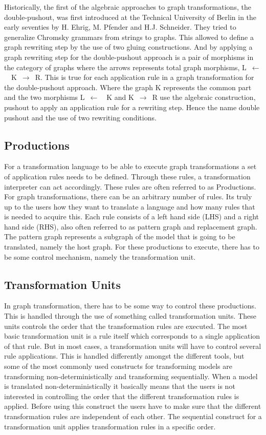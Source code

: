\documentclass[pdftex,11pt,a4paper]{article}
\begin{document}
\indent Historically, the first of the algebraic approaches to graph
transformations, the double-pushout, was first introduced at the Technical
University of Berlin in the early seventies by H. Ehrig, M. Pfender and H.J.
Schneider\cite{INSPEC:606170}. They tried to generalize Chromsky grammars from
strings to graphs. This allowed to define a graph rewriting step by the use of
two gluing constructions. And by applying a graph rewriting step for the
double-pushout approach is a pair of morphisms in the category of graphs where
the arrows represents total graph morphisms, \linebreak\mbox{L $\longleftarrow$
\ K $\longrightarrow$ R}. This is true for each application rule in a graph
transformation for the double-pushout approach. Where the graph K represents the
common part and the two morphisms \mbox{L $\longleftarrow$ \ K} and \mbox{K
$\longrightarrow$ R} use the algebraic construction, pushout to apply an
application rule for a rewriting step. Hence the name double pushout and the use
of two rewriting conditions.

\subsection{Productions}
\noindent For a transformation language to be able to execute graph
transformations a set of application rules needs to be defined. Through these
rules, a transformation interpreter can act accordingly. These rules are often
referred to as Productions. For graph transformations, there can be an arbitrary
number of rules. Its truly up to the users how they want to translate a
language and how many rules that is needed to acquire this. Each rule consists
of a left hand side (LHS) and a right hand side (RHS), also often referred to as
pattern graph and replacement graph. The pattern graph represents a subgraph of
the model that is going to be translated, namely the host graph. For these
productions to execute, there has to be some control mechanism, namely the
transformation unit.


\subsection{Transformation Units}
\noindent In graph transformation, there has to be some way to control these
productions. This is handled through the use of something called transformation
units. These units controls the order that the transformation rules are
executed. The most basic transformation unit is a rule itself which corresponds
to a single application of that rule. But in most cases, a transformation units
will have to control several rule applications. This is handled differently
amongst the different tools, but some of the most commonly used constructs for
transforming models are transforming non-deterministically and transforming
sequentially. When a model is translated non-deterministically it basically
means that the users is not interested in controlling the order that the
different transformation rules is applied. Before using this construct the users
have to make sure that the different transformation rules are independent of
each other. The sequential construct for a transformation unit applies
transformation rules in a specific order.
\end{document}
